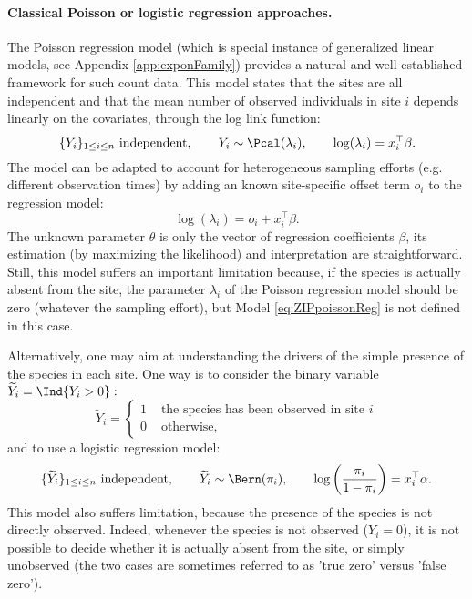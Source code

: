 \paragraph{Classical Poisson or logistic regression approaches.} 
The Poisson regression model (which is special instance of generalized linear models, see Appendix \ref{app:exponFamily}) provides a natural and well established framework for such count data.
This model states that the sites are all independent and that the mean number of observed individuals in site $i$ depends linearly on the covariates, through the log link function: 
\begin{equation} \label{eq:ZIPpoissonReg}
  \{Y_i\}_{1 \leq i \leq n} \text{ independent}, \qquad
  Y_i \sim \Pcal(\lambda_i), \qquad
  \log(\lambda_i) = x_i^\top \beta.
\end{equation}
The model can be adapted to account for heterogeneous sampling efforts (e.g. different observation times) by adding an known site-specific offset term $o_i$ to the regression model:
\begin{equation} \label{eq:ZIPpoissonRegOffset}
\log(\lambda_i) = o_i + x_i^\top \beta.
\end{equation}
The unknown parameter $\theta$ is only the vector of regression coefficients $\beta$, its estimation (by maximizing the likelihood) and interpretation are straightforward. \\
Still, this model suffers an important limitation because, if the species is actually absent from the site, the parameter $\lambda_i$ of the Poisson regression model should be zero (whatever the sampling effort), but Model \eqref{eq:ZIPpoissonReg} is not defined in this case. 

Alternatively, one may aim at understanding the drivers of the simple presence of the species in each site. 
One way is to consider the binary variable  $\widetilde{Y}_i = \Ind{Y_i >0}:$ 
$$
\widetilde{Y}_i = \left\{ 
\begin{array}{cll}
 1 & \mbox{ the species has been observed in site $i$}\\
 0 & \mbox{ otherwise, }
\end{array}
\right. 
$$
and to use a logistic regression model:
\begin{equation} \label{eq:ZIPlogisticReg}
  \{\widetilde{Y}_i\}_{1 \leq i \leq n} \text{ independent}, \qquad
  \widetilde{Y}_i \sim \Bern(\pi_i), \qquad
  \log\left(\frac{\pi_i}{1 - \pi_i}\right) = x_i^\top \alpha.
\end{equation}
This model also suffers limitation, because the presence of the species is not directly observed. Indeed, whenever the species is not observed ($Y_i = 0$), it is not possible to decide whether it is actually absent from the site, or simply unobserved (the two cases are sometimes referred to as 'true zero' versus 'false zero').

